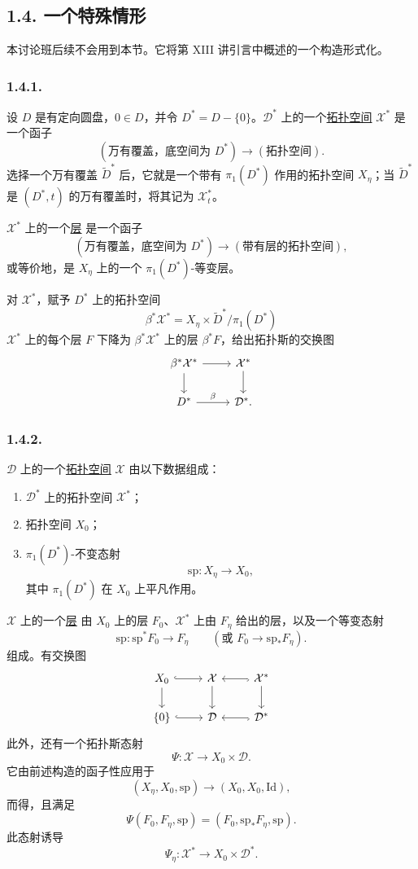 \subsection*{1.4. 一个特殊情形}

本讨论班后续不会用到本节。它将第 XIII 讲引言中概述的一个构造形式化。

\subsubsection*{1.4.1.}
设 $D$ 是有定向圆盘，$0\in D$，并令 $D^*=D-\{0\}$。$\mathcal D^*$ 上的一个\underline{拓扑空间} $\mathcal X^*$ 是一个函子
\[
(\text{万有覆盖，底空间为 }D^*)
\longrightarrow(\text{拓扑空间}).
\]
选择一个万有覆盖 $\widetilde D^*$ 后，它就是一个带有 $\pi_1(D^*)$ 作用的拓扑空间 $X_\eta$；当 $\widetilde D^*$ 是 $(D^*,t)$ 的万有覆盖时，将其记为 $\mathcal X_t^*$。

$\mathcal X^*$ 上的一个\underline{层} 是一个函子
\[
(\text{万有覆盖，底空间为 }D^*)
\longrightarrow
(\text{带有层的拓扑空间}),
\]
或等价地，是 $X_\eta$ 上的一个 $\pi_1(D^*)$-等变层。

对 $\mathcal X^*$，赋予 $D^*$ 上的拓扑空间
\[
\beta^*\mathcal X^*
=X_\eta\times\widetilde D^*/\pi_1(D^*)
\]
$\mathcal X^*$ 上的每个层 $F$ 下降为 $\beta^*\mathcal X^*$ 上的层 $\beta^*F$，给出拓扑斯的交换图
\[
\begin{tikzcd}
\beta^*\mathcal X^* \arrow[r] \arrow[d]
  & \mathcal X^* \arrow[d] \\
D^* \arrow[r, "\beta"]
  & \mathcal D^*.
\end{tikzcd}
\]

\subsubsection*{1.4.2.}
$\mathcal D$ 上的一个\underline{拓扑空间} $\mathcal X$ 由以下数据组成：
\begin{enumerate}[label=(\alph*),leftmargin=2.7em]
\item $\mathcal D^*$ 上的拓扑空间 $\mathcal X^*$；
\item 拓扑空间 $X_0$；
\item $\pi_1(D^*)$-不变态射
\[
\mathrm{sp}:X_\eta\longrightarrow X_0,
\]
其中 $\pi_1(D^*)$ 在 $X_0$ 上平凡作用。
\end{enumerate}

$\mathcal X$ 上的一个\underline{层} 由 $X_0$ 上的层 $F_0$、$\mathcal X^*$ 上由 $F_\eta$ 给出的层，以及一个等变态射
\[
\mathrm{sp}:\mathrm{sp}^*F_0\longrightarrow F_\eta
\qquad
(\text{或 }F_0\longrightarrow\mathrm{sp}_*F_\eta).
\]
组成。有交换图
\[
\begin{tikzcd}
X_0 \arrow[r, hook] \arrow[d]
  & \mathcal X \arrow[d]
  & \mathcal X^* \arrow[l, hook] \arrow[d] \\
\{0\} \arrow[r, hook]
  & \mathcal D
  & \mathcal D^* \arrow[l, hook]
\end{tikzcd}
\]
此外，还有一个拓扑斯态射
\[
\Psi:\mathcal X\longrightarrow X_0\times\mathcal D.
\]
它由前述构造的函子性应用于
\[
(X_\eta,X_0,\mathrm{sp})
\longrightarrow(X_0,X_0,\mathrm{Id}),
\]
而得，且满足
\[
\Psi(F_0,F_\eta,\mathrm{sp})
=(F_0,\mathrm{sp}_*F_\eta,\mathrm{sp}).
\]
此态射诱导
\[
\Psi_\eta:\mathcal X^*\longrightarrow X_0\times\mathcal D^*.
\]

